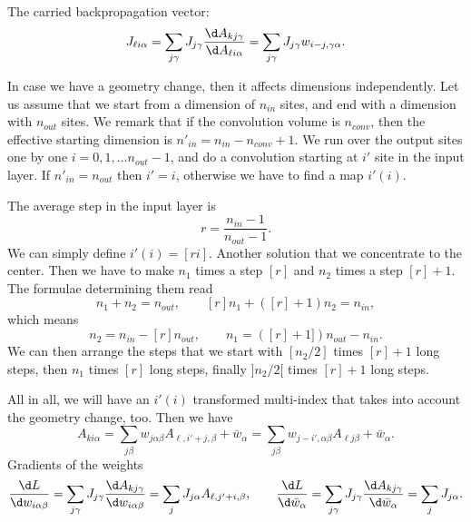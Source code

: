 \documentclass{article}
\begin{document}
The carried backpropagation vector:
\begin{equation}
  J_{\ell i\alpha} = \sum_{j\gamma} J_{j\gamma} \frac{\d
    A_{kj\gamma}}{\d A_{\ell i\alpha }} = \sum_{j\gamma} J_{j\gamma}
  w_{i-j,\gamma\alpha}.
\end{equation}

In case we have a geometry change, then it affects dimensions
independently. Let us assume that we start from a dimension of
$n_{in}$ sites, and end with a dimension with $n_{out}$ sites. We
remark that if the convolution volume is $n_{conv}$, then the
effective starting dimension is $n'_{in}=n_{in}-n_{conv}+1$. We run
over the output sites one by one $i=0,1,\dots n_{out}-1$, and do a
convolution starting at $i'$ site in the input layer. If
$n'_{in}=n_{out}$ then $i'=i$, otherwise we have to find a map
$i'(i)$.

The average step in the input layer is
\begin{equation}
  r = \frac{n_{in}-1}{n_{out}-1}.
\end{equation}
We can simply define $i'(i) = [ri]$. Another solution that we
concentrate to the center. Then we have to make $n_1$ times a step $[r]$
and $n_2$ times a step $[r]+1$. The formulae determining them read
\begin{equation}
  n_1+n_2 =n_{out},\qquad [r] n_1+([r]+1) n_2 = n_{in},
\end{equation}
which means
\begin{equation}
  n_2 = n_{in} - [r] n_{out},\qquad n_1= ([r]+1]) n_{out}-n_{in}.
\end{equation}
We can then arrange the steps that we start with $[n_2/2]$ times
$[r]+1$ long steps, then $n_1$ times $[r]$ long steps, finally
$]n_2/2[$ times $[r]+1$ long steps.

All in all, we will have an $i'(i)$ transformed multi-index that takes
into account the geometry change, too. Then we have
\begin{equation}
  A_{ki\alpha} = \sum_{j\beta} w_{j\alpha\beta} A_{\ell,i'+j,\beta} +
  \bar w_{\alpha} = \sum_{j\beta} w_{j-i',\alpha\beta} A_{\ell j\beta}
  + \bar w_{\alpha}.
\end{equation}
Gradients of the weights
\begin{equation}
  \frac{\d L}{\d w_{i\alpha\beta}} = \sum_{j\gamma} J_{j\gamma} \frac{\d
    A_{kj\gamma}}{\d w_{i\alpha\beta}} = \sum_{j}J_{j\alpha} A_{\ell,j'+i,\beta},\qquad 
  \frac{\d L}{\d \bar w_\alpha} = \sum_{j\gamma} J_{j\gamma} \frac{\d
    A_{kj\gamma}}{\d \bar w_\alpha} = \sum_{j} J_{j\alpha}.
\end{equation}
\end{document}
